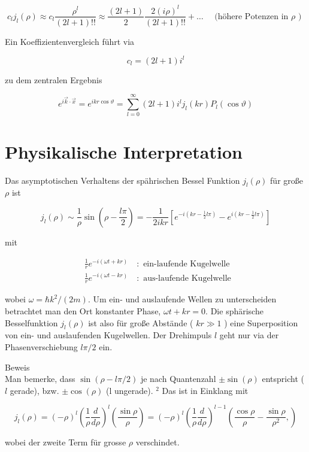 \documentclass[10pt, letterpaper]{article}
\begin{document}
$$
c_{l} j_{l}(\rho) \approx c_{l} \frac{\rho^{l}}{(2 l+1)!!} \approx \frac{(2 l+1)}{2} \frac{2(i \rho)^{l}}{(2 l+1)!!}+\ldots \quad \text { (höhere Potenzen in } \rho \text { ) }
$$

Ein Koeffizientenvergleich führt via

$$
c_{l}=(2 l+1) i^{l}
$$

zu dem zentralen Ergebnis

$$
e^{i \vec{k} \cdot \vec{x}}=e^{i k r \cos \vartheta}=\sum_{l=0}^{\infty}(2 l+1) i^{l} j_{l}(k r) P_{l}(\cos \vartheta)
$$

\section*{Physikalische Interpretation}
Das asymptotischen Verhaltens der spährischen Bessel Funktion $j_{l}(\rho)$ für große $\rho$ ist

$$
j_{l}(\rho) \sim \frac{1}{\rho} \sin \left(\rho-\frac{l \pi}{2}\right)=-\frac{1}{2 i k r}\left[e^{-i\left(k r-\frac{1}{2} l \pi\right)}-e^{i\left(k r-\frac{1}{2} l \pi\right)}\right]
$$

mit

$$
\begin{aligned}
& \frac{1}{r} e^{-i(\omega t+k r)} \quad: \text { ein-laufende Kugelwelle } \\
& \frac{1}{r} e^{-i(\omega t-k r)} \quad: \text { aus-laufende Kugelwelle }
\end{aligned}
$$

wobei $\omega=\hbar k^{2} /(2 m)$. Um ein- und auslaufende Wellen zu unterscheiden betrachtet man den Ort konstanter Phase, $\omega t+k r=0$. Die sphärische Besselfunktion $j_{l}(\rho)$ ist also für große Abstände ( $k r \gg 1$ ) eine Superposition von ein- und auslaufenden Kugelwellen. Der Drehimpuls $l$ geht nur via der Phasenverschiebung $l \pi / 2$ ein.

Beweis\\
Man bemerke, dass $\sin (\rho-l \pi / 2)$ je nach Quantenzahl $\pm \sin (\rho)$ entspricht ( $l$ gerade), bzw. $\pm \cos (\rho)$ (l ungerade). ${ }^{2}$ Das ist in Einklang mit

$$
j_{l}(\rho)=(-\rho)^{l}\left(\frac{1}{\rho} \frac{d}{d \rho}\right)^{l}\left(\frac{\sin \rho}{\rho}\right)=(-\rho)^{l}\left(\frac{1}{\rho} \frac{d}{d \rho}\right)^{l-1}\left(\frac{\cos \rho}{\rho}-\frac{\sin \rho}{\rho^{2}},\right)
$$

wobei der zweite Term für grosse $\rho$ verschindet.
\end{document}
